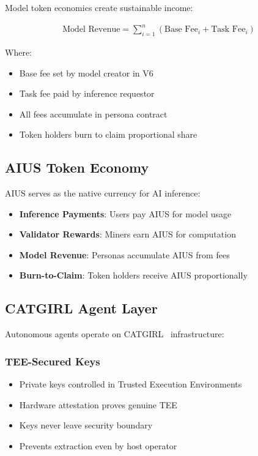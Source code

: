 \documentclass{article}
\begin{document}
Model token economics create sustainable income:

\begin{align}
\text{Model Revenue} = \sum_{i=1}^{n} (\text{Base Fee}_i + \text{Task Fee}_i)
\end{align}

Where:
\begin{itemize}
    \item Base fee set by model creator in V6
    \item Task fee paid by inference requestor
    \item All fees accumulate in persona contract
    \item Token holders burn to claim proportional share
\end{itemize}

\subsection{AIUS Token Economy}

AIUS serves as the native currency for AI inference:

\begin{itemize}
    \item \textbf{Inference Payments}: Users pay AIUS for model usage
    \item \textbf{Validator Rewards}: Miners earn AIUS for computation
    \item \textbf{Model Revenue}: Personas accumulate AIUS from fees
    \item \textbf{Burn-to-Claim}: Token holders receive AIUS proportionally
\end{itemize}

\subsection{CATGIRL Agent Layer}

Autonomous agents operate on CATGIRL~\cite{catgirl2025} infrastructure:

\subsubsection{TEE-Secured Keys}
\begin{itemize}
    \item Private keys controlled in Trusted Execution Environments
    \item Hardware attestation proves genuine TEE
    \item Keys never leave security boundary
    \item Prevents extraction even by host operator
\end{itemize}
\end{document}

